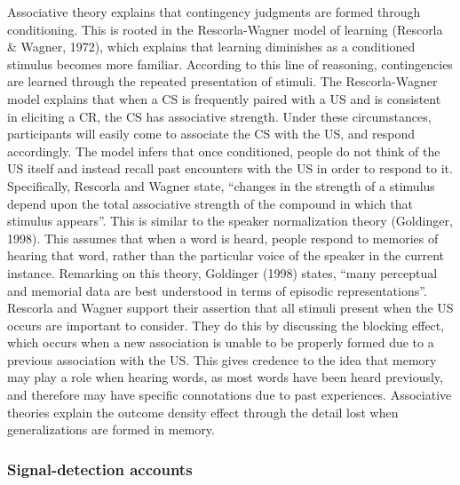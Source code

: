 \documentclass[
  english,
  man,floatsintext]{apa6}
\begin{document}
Associative theory explains that contingency judgments are formed through conditioning. This is rooted in the Rescorla-Wagner model of learning (Rescorla \& Wagner, 1972), which explains that learning diminishes as a conditioned stimulus becomes more familiar. According to this line of reasoning, contingencies are learned through the repeated presentation of stimuli. The Rescorla-Wagner model explains that when a CS is frequently paired with a US and is consistent in eliciting a CR, the CS has associative strength. Under these circumstances, participants will easily come to associate the CS with the US, and respond accordingly. The model infers that once conditioned, people do not think of the US itself and instead recall past encounters with the US in order to respond to it. Specifically, Rescorla and Wagner state, \enquote{changes in the strength of a stimulus depend upon the total associative strength of the compound in which that stimulus appears}. This is similar to the speaker normalization theory (Goldinger, 1998). This assumes that when a word is heard, people respond to memories of hearing that word, rather than the particular voice of the speaker in the current instance. Remarking on this theory, Goldinger (1998) states, \enquote{many perceptual and memorial data are best understood in terms of episodic representations}. Rescorla and Wagner support their assertion that all stimuli present when the US occurs are important to consider. They do this by discussing the blocking effect, which occurs when a new association is unable to be properly formed due to a previous association with the US. This gives credence to the idea that memory may play a role when hearing words, as most words have been heard previously, and therefore may have specific connotations due to past experiences. Associative theories explain the outcome density effect through the detail lost when generalizations are formed in memory.

\hypertarget{signal-detection-accounts}{%
\subsubsection{Signal-detection accounts}\label{signal-detection-accounts}}
\end{document}
